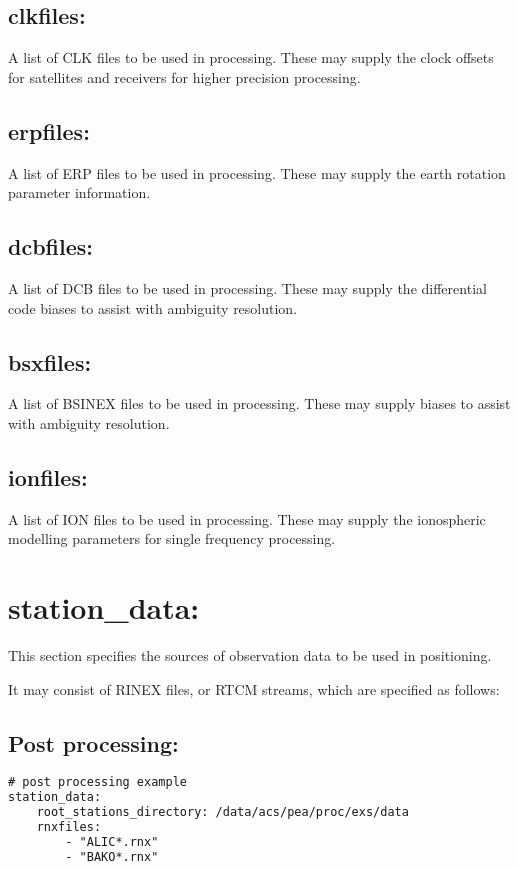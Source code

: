 \subsection{clkfiles:}
A list of CLK files to be used in processing. These may supply the clock offsets for satellites and receivers for higher precision processing.

\subsection{erpfiles:}
A list of ERP files to be used in processing. These may supply the earth rotation parameter information.

\subsection{dcbfiles:}
A list of DCB files to be used in processing. These may supply the differential code biases to assist with ambiguity resolution.

\subsection{bsxfiles:}
A list of BSINEX files to be used in processing. These may supply biases to assist with ambiguity resolution.

\subsection{ionfiles:}
A list of ION files to be used in processing. These may supply the ionospheric modelling parameters for single frequency processing.

\section{station\_data:}
This section specifies the sources of observation data to be used in positioning.

It may consist of RINEX files, or RTCM streams, which are specified as follows:
\subsection{Post processing:}

\begin{lstlisting}[language=xml,caption=station\_data:]
# post processing example
station_data:
	root_stations_directory: /data/acs/pea/proc/exs/data
	rnxfiles:
		- "ALIC*.rnx"
		- "BAKO*.rnx"
\end{lstlisting}


